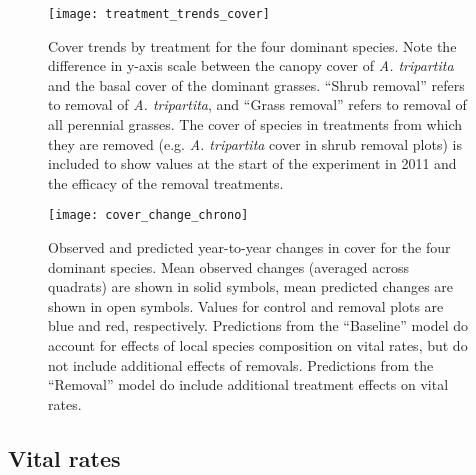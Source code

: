 \documentclass[11pt]{article}
\begin{document}
\begin{doublespacing}
\begin{figure}[tbp]
\centering
\texttt{[image: treatment\_trends\_cover]}
\caption{Cover trends by treatment for the four dominant species.  Note the difference in y-axis scale between the canopy cover of \textit{A. tripartita} and the basal cover of the dominant grasses. ``Shrub removal'' refers to removal of \textit{A. tripartita}, and ``Grass removal'' refers to removal of all perennial grasses. The cover of species in treatments from which they are removed (e.g. \textit{A. tripartita} cover in shrub removal plots) is included to show values at the start of the experiment in 2011 and the efficacy of the removal treatments.}
\label{fig:CoverTrends}
\end{figure}


\begin{figure}[tbp]
\centering
\texttt{[image: cover\_change\_chrono]}
\caption{Observed and predicted year-to-year changes in cover for the four dominant species. Mean observed changes (averaged across quadrats) are shown in solid symbols, mean predicted changes are shown in open symbols. Values for control and removal plots are blue and red, respectively. Predictions from the ``Baseline'' model do account for effects of local species composition on vital rates, but do not include additional effects of removals. Predictions from the ``Removal'' model do include additional treatment effects on vital rates. }
\label{fig:CoverChange}
\end{figure}

\subsection*{Vital rates}


\end{doublespacing}
\end{document}
